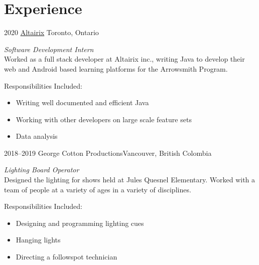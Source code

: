 \documentclass[]{style}
\begin{document}

\section{Experience}

\begin{entrylist}


\entry
{2020}
{\href{https://www.altairix.com/}{Altairix}}
{Toronto, Ontario}
{\emph{Software Development Intern} \\
Worked as a full stack developer at Altairix inc., writing Java to develop their web and Android based learning platforms for the Arrowsmith Program.

Responsibilities Included:

\begin{itemize}
	\item Writing well documented and efficient Java
	\item Working with other developers on large scale feature sets
	\item Data analysis
\end{itemize}}


\entry
{2018–2019}
{George Cotton Productions}{Vancouver, British Colombia}
{\emph{Lighting Board Operator} \\
Designed the lighting for shows held at Jules Quesnel Elementary. Worked with a team of people at a variety of ages in a variety of disciplines.

Responsibilities Included:

\begin{itemize}
	\item Designing and programming lighting cues
	\item Hanging lights
	\item Directing a followspot technician
\end{itemize}}


\end{entrylist}


\end{document}
